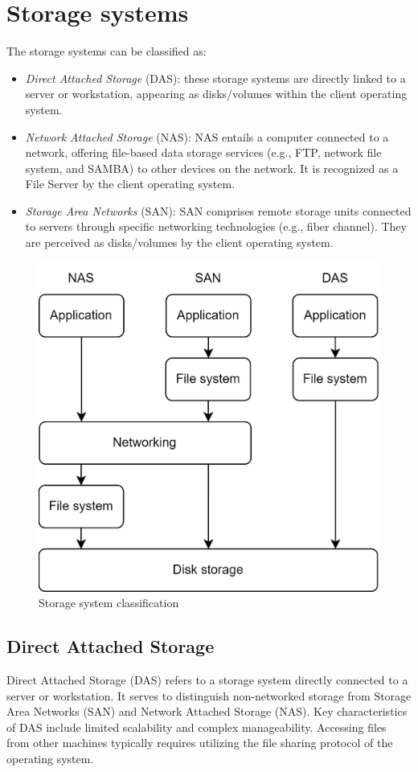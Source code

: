 \section{Storage systems}

The storage systems can be classified as: 
\begin{itemize}
    \item \textit{Direct Attached Storage} (DAS): these storage systems are directly linked to a server or workstation, appearing as disks/volumes within the client operating system.
    \item \textit{Network Attached Storage} (NAS): NAS entails a computer connected to a network, offering file-based data storage services (e.g., FTP, network file system, and SAMBA) to other devices on the network. 
        It is recognized as a File Server by the client operating system.
    \item \textit{Storage Area Networks} (SAN): SAN comprises remote storage units connected to servers through specific networking technologies (e.g., fiber channel). 
        They are perceived as disks/volumes by the client operating system.
\end{itemize}
\begin{figure}[H]
    \centering
    \includegraphics[width=0.6\linewidth]{images/ssc.png}
    \caption{Storage system classification}
\end{figure}

\subsection{Direct Attached Storage}
Direct Attached Storage (DAS) refers to a storage system directly connected to a server or workstation. 
It serves to distinguish non-networked storage from Storage Area Networks (SAN) and Network Attached Storage (NAS). 
Key characteristics of DAS include limited scalability and complex manageability. 
Accessing files from other machines typically requires utilizing the file sharing protocol of the operating system.

